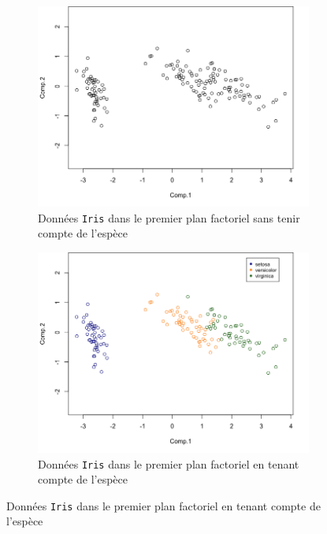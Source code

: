 \documentclass[a4paper,10pt]{report}
\begin{document}
\begin{figure}[H]
	\centering
	\captionsetup{justification=centering, margin=2cm}
	\caption{\small Représentation des données \texttt{Iris} dans le premier plan factoriel après ACP}
	\begin{subfigure}[b]{0.5\linewidth}
		\centering
		\captionsetup{justification=centering, margin=1cm}
		\includegraphics[width=1\linewidth]{img/1-iris-acp-premier-plan-factoriel}
		\caption{\scriptsize Données \texttt{Iris} dans le premier plan factoriel sans tenir compte de l'espèce}
		\label{fig:1-iris-acp-premier-plan-factoriel}
	\end{subfigure}%
	\begin{subfigure}[b]{0.5\linewidth}
		\centering
		\captionsetup{justification=centering, margin=1cm}
		\includegraphics[width=1\linewidth]{img/1-iris-acp-premier-plan-factoriel-discr-species}
		\caption{\scriptsize Données \texttt{Iris} dans le premier plan factoriel en tenant compte de l'espèce}
		\label{fig:1-iris-acp-premier-plan-factoriel-discr-species}
	\end{subfigure}%
	
	\label{fig:1-iris-acp-representation-graphique}%
\end{figure}
\end{document}
